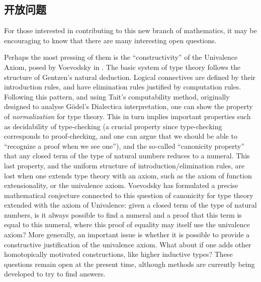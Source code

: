 %

\subsection*{开放问题} 

%

For those interested in contributing to this new branch of mathematics, it may be encouraging to know that there are many interesting open questions.

%
Perhaps the most pressing of them is the ``constructivity'' of the Univalence Axiom, posed by Voevodsky in \cite{Universe-poly}.
The basic system of type theory follows the structure of Gentzen's natural deduction. Logical connectives are defined by their introduction rules, and have elimination rules justified by computation rules. Following this pattern, and using Tait's computability method, originally designed to analyse G\"odel's Dialectica interpretation, one can show the property of \emph{normalization} for type theory. This in turn implies important properties such as decidability of type-checking (a crucial property since type-checking corresponds to proof-checking, and one can argue that we should be able to ``recognize a proof when we see one''), and the so-called ``canonicity property'' that any closed term of the type of natural numbers reduces to a numeral. This last property, and the uniform structure of introduction/elimination rules, are lost when one extends type theory with an axiom, such as the axiom of function extensionality, or the univalence axiom. Voevodsky has formulated a precise mathematical conjecture connected to this question of canonicity for type theory extended with the axiom of Univalence: given a closed term of the type of natural numbers, is it always possible to find a numeral and a proof that this term is equal to this numeral, where this proof of equality may itself use the univalence axiom? More generally, an important issue is whether it is possible to provide a constructive justification of the univalence axiom.
What about if one adds other homotopically motivated constructions, like higher inductive types?
These questions remain open at the present time, although methods are currently being developed to try to find answers.

